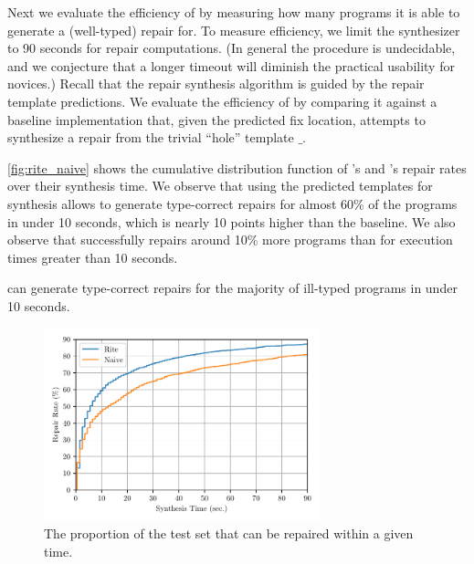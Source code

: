 Next we evaluate the efficiency of \toolname by measuring how many programs it
is able to generate a (well-typed) repair for.
%
To measure efficiency, we limit the synthesizer to 90 seconds for repair
computations.
(In general the procedure is undecidable, and we
conjecture that a longer timeout will diminish the practical usability for
novices.)
%
Recall that the repair synthesis algorithm is guided by the repair template
predictions.
%
We evaluate the efficiency of \toolname by comparing
it against a baseline \naive implementation that, given the predicted fix
location, attempts to synthesize a repair from the trivial ``hole'' template
$\_$.

\autoref{fig:rite_naive} shows the cumulative distribution function of
\toolname's and \naive's repair rates over their synthesis time. We observe that
using the predicted templates for synthesis allows \toolname to generate
type-correct repairs for almost 60\% of the programs in under 10 seconds, which
is nearly 10 points higher than the \naive baseline. We also observe that
\toolname successfully repairs around 10\% more programs than \naive
for execution times greater than 10 seconds.

\begin{framed}
  \noindent \toolname can generate type-correct repairs for the majority of
  ill-typed programs in under 10 seconds.
\end{framed}



\begin{figure}
  \centering
  \includegraphics[height=2.2in]{cdf.pdf}
  \caption{The proportion of the test set that can be repaired within a given time.}
  \label{fig:rite_naive}
\end{figure}

